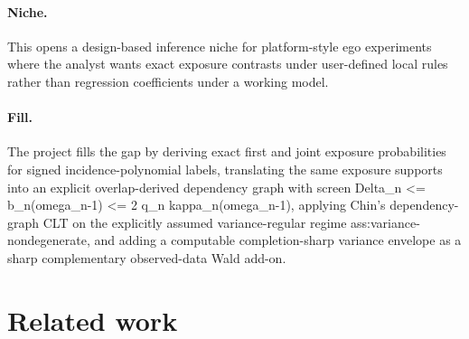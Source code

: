 \documentclass{article}
\begin{document}
\paragraph{Niche.} This opens a design-based inference niche for platform-style ego experiments where the analyst wants exact exposure contrasts under user-defined local rules rather than regression coefficients under a working model.

\paragraph{Fill.} The project fills the gap by deriving exact first and joint exposure probabilities for signed incidence-polynomial labels, translating the same exposure supports into an explicit overlap-derived dependency graph with screen Delta_n <= b_n(omega_n-1) <= 2 q_n kappa_n(omega_n-1), applying Chin's dependency-graph CLT on the explicitly assumed variance-regular regime ass:variance-nondegenerate, and adding a computable completion-sharp variance envelope as a sharp complementary observed-data Wald add-on.

\section{Related work}
\end{document}
